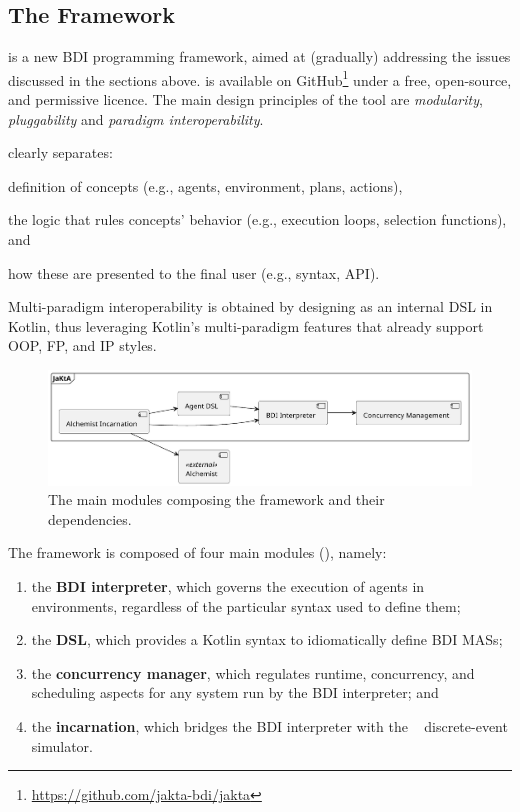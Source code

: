 \subsection{The \jakta{} Framework}

\jakta{} is a new \ac{BDI} programming framework,
aimed at (gradually) addressing the issues discussed in the sections above.
%
\jakta{} is available on GitHub\footnote{\url{https://github.com/jakta-bdi/jakta}}
under a free, open-source, and permissive licence.
%
The main design principles of the tool are \emph{modularity},
\emph{pluggability} and
\emph{paradigm interoperability}.

\jakta{} clearly separates:
\begin{inlinelist}
    \item definition of concepts (e.g., agents, environment, plans, actions),
    \item the logic that rules concepts' behavior (e.g., execution loops, selection functions),
    and
    \item how these are presented to the final user (e.g., syntax, \ac{API}).
\end{inlinelist}
%
Multi-paradigm interoperability is obtained by designing \jakta{} as an internal \ac{DSL} in Kotlin,
thus leveraging Kotlin's multi-paradigm features that already support \ac{OOP}, \ac{FP}, and \ac{IP} styles.

\begin{figure}
    \centering
    \includegraphics[width=\textwidth]{figures/mas/jakta_modules.pdf}
    \caption{
        The main modules composing the \jakta{} framework and their dependencies.
    }
    \label{fig:jakta-modules}
\end{figure}

The \jakta{} framework is composed of four main modules (), namely:
%
\begin{enumerate}
    \item the \textbf{\ac{BDI} interpreter}, which governs the execution of agents in environments,
    regardless of the particular syntax used to define them;
    \item the \textbf{\ac{DSL}}, which provides a Kotlin syntax to idiomatically define \ac{BDI} \acp{MAS};
    \item the \textbf{concurrency manager}, which regulates runtime, concurrency, and scheduling aspects for
    any system run by the \ac{BDI} interpreter;
    and
    \item the \textbf{\alchemist{} incarnation},
    which bridges the \ac{BDI} interpreter with the \alchemist{}~\cite{PianiniJOS2013} discrete-event simulator.
\end{enumerate}

